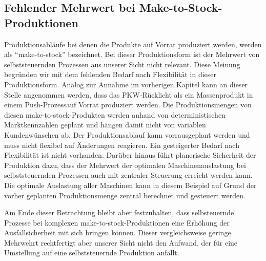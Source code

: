 \subsection{Fehlender Mehrwert bei Make-to-Stock-Produktionen}
\label{sec:GrenzenMakeToStock}

Produktionsabläufe bei denen die Produkte auf Vorrat produziert werden, werden als "`make-to-stock"' bezeichnet. Bei dieser 
Produktionsform ist der Mehrwert von selbststeuernden Prozessen aus unserer Sicht nicht relevant. 
Diese Meinung begründen wir mit dem fehlenden Bedarf nach Flexibilität in dieser Produktionsform.
Analog zur Annahme im vorherigen Kapitel kann an dieser Stelle angenommen werden, dass das PKW-Rücklicht als ein 
Massenprodukt in einem Push-Prozess\footnotemark auf Vorrat produziert werden. 
Die Produktionsmengen von diesen make-to-stock-Produkten 
werden anhand von deterministischen Marktkennzahlen geplant und hängen damit nicht von variablen Kundenwünschen ab. Der 
Produktionsablauf kann vorrausgeplant werden und muss nicht flexibel auf Änderungen reagieren. Ein gesteigerter Bedarf 
nach Flexibilität ist nicht vorhanden.
Darüber hinaus führt planerische Sicherheit der Produktion dazu, dass der Mehrwert der optimalen Maschinenauslastung bei 
selbststeuernden Prozessen auch mit zentraler Steuerung erreicht werden kann. Die optimale Auslastung aller Maschinen kann 
in diesem Beispiel auf Grund der vorher geplanten Produktionsmenge zentral berechnet und gesteuert werden.


Am Ende dieser Betrachtung bleibt aber festzuhalten, dass selbsteuernde Prozesse bei komplexen make-to-stock-Produktionen 
eine Erhöhung der Ausfallsicherheit mit sich bringen können. Dieser vergleichsweise geringe Mehrwehrt rechtfertigt aber 
unserer Sicht nicht den Aufwand, der für eine Umstellung auf eine selbststeuernde Produktion anfällt.
